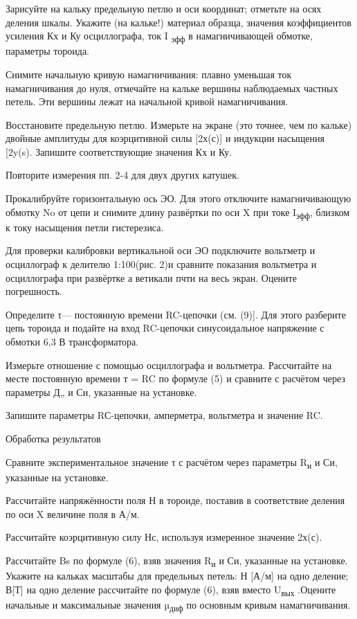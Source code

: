\documentclass[]{article}
\begin{document}
Зарисуйте на кальку предельную петлю и оси координат; отметьте на осях
деления шкалы. Укажите (на кальке!) материал образца, зна­чения
коэффициентов усиления Кх и Ку осциллографа, ток I \textsubscript{эфф} в
намагничивающей обмотке, параметры тороида.

Снимите начальную кривую намагничивания: плавно уменьшая ток
намагничивания до нуля, отмечайте на кальке вершины наблюдаемых частных
петель. Эти вершины лежат на начальной кривой намагничи­вания.

Восстановите предельную петлю. Измерьте на экране (это точнее, чем по
кальке) двойные амплитуды для коэрцитивной силы {[}2х(с){]} и индукции
насыщения {[}2y(s). Запишите соответствующие значения Кх и Ку.

Повторите измерения пп. 2-4 для двух других катушек.

Прокалибруйте горизонтальную ось ЭО. Для этого отключите
на­магничивающую обмотку No от цепи и снимите длину развёртки по оси X
при токе I\textsubscript{эфф}, близком к току насыщения петли
гистерезиса.

Для проверки калибровки вертикальной оси ЭО подключите вольтметр и
осциллограф к делителю 1:100(рис. 2)и сравните показания вольтметра и
осциллографа при развёртке а ветикали пчти на весь экран. Оцените
погрешность.

Определите τ--- постоянную времени RC-цепочки (см. (9){]}. Для этого
разберите цепь тороида и подайте на вход RC-цепочки синусоидальное
напряжение с обмотки 6,3 В трансформатора.

Измерьте отношение с помощью осциллографа и вольтметра. Рассчитайте на
месте постоянную времени т = RC по формуле (5) и сравните с расчётом
через параметры Д„ и Си, указанные на установке.

Запишите параметры RС-цепочки, амперметра, вольтметра и значе­ние RC.

\protect\hypertarget{bookmark66}{}{}Обработка результатов

Сравните экспериментальное значение τ с расчётом через парамет­ры
R\textsubscript{и} и Си, указанные на установке.

Рассчитайте напряжённости поля Н в тороиде, поставив в соответствие
деления по оси X величине поля в А/м.

Рассчитайте коэрцитивную силу Нс, используя измеренное значе­ние 2х(с).

Рассчитайте Bs по формуле (6), взяв значения R\textsubscript{и} и Си,
указанные на установке. Укажите на кальках масштабы для предельных
петель: Н {[}А/м{]} на одно деление; В{[}Т{]} на одно деление
рассчи­тайте по формуле (6), взяв вместо U\textsubscript{вых} .Оцените
начальные и максимальные значения µ\textsubscript{диф} по основным
кривым намаг­ничивания.
\end{document}
